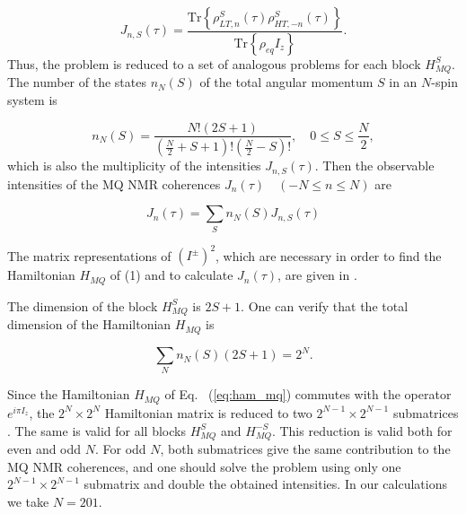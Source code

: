 \begin{equation}
    \label{eq:coherence_k_s}
    J_{n, S}(\tau) = \dfrac{\mathrm{Tr}\left\{
        \rho_{LT, n}^S(\tau)\rho_{HT, -n}^S(\tau)
    \right\}}
    {\mathrm{Tr}\left\{\rho_{eq} I_z\right\}}.
\end{equation}
Thus, the problem is reduced to a set of analogous problems for each block $H_{MQ}^S$. The number of the states $n_N(S)$ of the total angular momentum $S$ in an $N$-spin system is \cite{Landau}

\begin{equation}
    \label{eq:coeff_n}
    n_N(S)  = \dfrac{ N! (2S+1)}
    {(\frac N 2 + S + 1)!(\frac N 2 - S)!}, 
    \quad
    0\leq S \leq \frac N 2, 
\end{equation}
which is also the multiplicity of the intensities $J_{n, S}(\tau)$. Then the observable intensities of the  MQ NMR coherences $J_n(\tau)\quad(-N\leq n \leq N)$ are 

\begin{equation}
    \label{eq:coherence_k}
    J_n(\tau) = \sum\limits_S n_N(S) J_{n, S}(\tau)
\end{equation}

The matrix representations of $(I^{\pm})^2$, which are necessary in order to find the Hamiltonian $H_{MQ}$ of (1) and to calculate $J_n(\tau)$, are given in \cite{lab:mq_nmr_dyn_in_nanopores_2009}. 

The dimension of the block $H_{MQ}^S$ is $2S+1$. One can verify \cite{lab:mq_nmr_dyn_in_nanopores_2009} that the total dimension of the Hamiltonian $H_{MQ}$ is 

\begin{equation}
    \sum\limits_N n_N(S)(2S+1) = 2^N.
\end{equation}

Since the Hamiltonian $H_{MQ}$ of Eq.   ~(\ref{eq:ham_mq}) commutes with the operator $e^{i\pi I_z}$, the $2^N\times2^N$ Hamiltonian matrix is reduced to two $2^{N-1}\times2^{N-1}$ submatrices \cite{lab:mq_nmr_dyn_in_nanopores_2009}. The same is valid for all blocks $H_{MQ}^S$ and $H_{MQ}^{-S}$. This reduction is valid both for even and odd $N$. For odd $N$, both submatrices give the same contribution to the MQ NMR coherences, and one should solve the problem using only one $2^{N-1}\times2^{N-1}$ submatrix and double the obtained intensities. In our calculations we take $N=201$.
